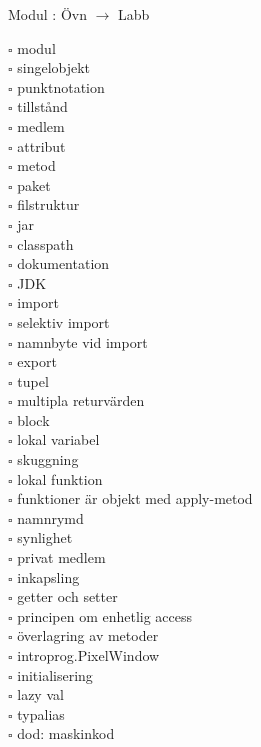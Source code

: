 
    Modul : Övn  $\rightarrow$ Labb 
    \begin{multicols}{3}\SlideFontTiny
    $\square$ modul \\
$\square$ singelobjekt \\
$\square$ punktnotation \\
$\square$ tillstånd \\
$\square$ medlem \\
$\square$ attribut \\
$\square$ metod \\
$\square$ paket \\
$\square$ filstruktur \\
$\square$ jar \\
$\square$ classpath \\
$\square$ dokumentation \\
$\square$ JDK \\
$\square$ import \\
$\square$ selektiv import \\
$\square$ namnbyte vid import \\
$\square$ export \\
$\square$ tupel \\
$\square$ multipla returvärden \\
$\square$ block \\
$\square$ lokal variabel \\
$\square$ skuggning \\
$\square$ lokal funktion \\
$\square$ funktioner är objekt med apply-metod \\
$\square$ namnrymd \\
$\square$ synlighet \\
$\square$ privat medlem \\
$\square$ inkapsling \\
$\square$ getter och setter \\
$\square$ principen om enhetlig access \\
$\square$ överlagring av metoder \\
$\square$ introprog.PixelWindow \\
$\square$ initialisering \\
$\square$ lazy val \\
$\square$ typalias \\
$\square$ dod: maskinkod \\
    \end{multicols}
    